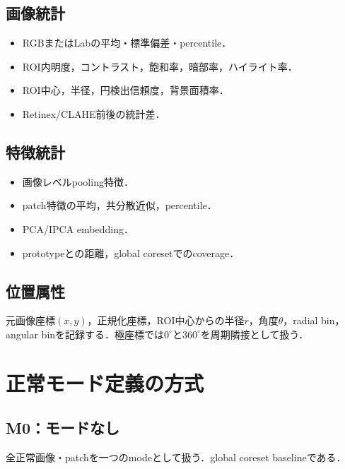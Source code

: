 \documentclass[a4paper,11pt]{ltjsarticle}
\begin{document}
\subsection{画像統計}
\begin{itemize}
  \item RGBまたはLabの平均・標準偏差・percentile．
  \item ROI内明度，コントラスト，飽和率，暗部率，ハイライト率．
  \item ROI中心，半径，円検出信頼度，背景面積率．
  \item Retinex/CLAHE前後の統計差．
\end{itemize}

\subsection{特徴統計}
\begin{itemize}
  \item 画像レベルpooling特徴．
  \item patch特徴の平均，共分散近似，percentile．
  \item PCA/IPCA embedding．
  \item prototypeとの距離，global coresetでのcoverage．
\end{itemize}

\subsection{位置属性}
元画像座標$(x,y)$，正規化座標，ROI中心からの半径$r$，角度$\theta$，radial bin，angular binを記録する．極座標では$0^\circ$と$360^\circ$を周期隣接として扱う．

\section{正常モード定義の方式}
\subsection{M0：モードなし}
全正常画像・patchを一つのmodeとして扱う．global coreset baselineである．
\end{document}

